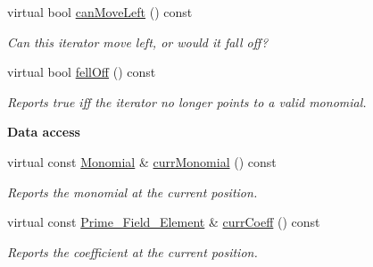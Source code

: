 \begin{Indent}
\begin{DoxyCompactItemize}
virtual bool \hyperlink{class_constant___polynomial___iterator_a6a29432be1533bb5850c7940984596c3}{can\+Move\+Left} () const
\begin{DoxyCompactList}\small\item\em Can this iterator move left, or would it fall off? \end{DoxyCompactList}\item 
virtual bool \hyperlink{class_constant___polynomial___iterator_aad50167fd2010a1a5c09358c777d40e0}{fell\+Off} () const
\begin{DoxyCompactList}\small\item\em Reports true iff the iterator no longer points to a valid monomial. \end{DoxyCompactList}\end{DoxyCompactItemize}
\end{Indent}
\begin{Indent}\textbf{ Data access}\par
\begin{DoxyCompactItemize}
\item 
\mbox{\label{class_constant___polynomial___iterator_a74d8a4b5189b73fdd43abf4e4cd0da2d}} 
virtual const \hyperlink{class_monomial}{Monomial} \& \hyperlink{class_constant___polynomial___iterator_a74d8a4b5189b73fdd43abf4e4cd0da2d}{curr\+Monomial} () const
\begin{DoxyCompactList}\small\item\em Reports the monomial at the current position. \end{DoxyCompactList}\item 
\mbox{\label{class_constant___polynomial___iterator_ace65808176ffab900891fc7bbced48c4}} 
virtual const \hyperlink{class_prime___field___element}{Prime\+\_\+\+Field\+\_\+\+Element} \& \hyperlink{class_constant___polynomial___iterator_ace65808176ffab900891fc7bbced48c4}{curr\+Coeff} () const
\begin{DoxyCompactList}\small\item\em Reports the coefficient at the current position. \end{DoxyCompactList}\end{DoxyCompactItemize}
\end{Indent}
